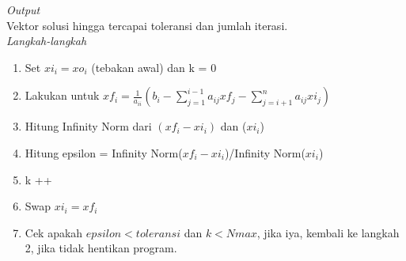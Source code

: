\documentclass[paper=a4, fontsize=11pt]{scrartcl}
\numberwithin{equation}{section} %
\numberwithin{figure}{section} %
\numberwithin{table}{section} %
\begin{document}
\textit{Output}\\
Vektor solusi hingga tercapai toleransi dan jumlah iterasi.\\

\textit{Langkah-langkah}
\begin{enumerate}
\item Set $xi_{i} = xo_{i}$ (tebakan awal) dan k = 0
\item Lakukan untuk $xf_{i} = \frac{1}{a_{ii}}\left(b_{i} -\sum_{j=1}^{i-1}a_{ij}xf_{j} -\sum_{j=i+1}^{n}a_{ij}xi_{j}\right)$
\item Hitung Infinity Norm dari $(xf_{i} - xi_{i})$ dan ($xi_{i}$)
\item Hitung epsilon = Infinity Norm($xf_{i} - xi_{i}$)/Infinity Norm($xi_{i}$)
\item k ++
\item Swap $xi_{i} = xf_{i}$
\item Cek apakah $epsilon < toleransi$ dan $k < Nmax$, jika iya, kembali ke langkah 2, jika tidak hentikan program.
\end{enumerate}
\end{document}
